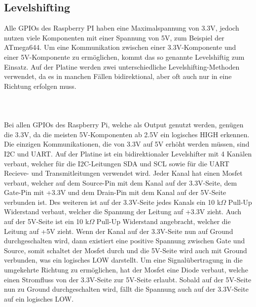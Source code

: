 \documentclass[12pt]{article}
\begin{document}
\subsection{Levelshifting}
Alle GPIOs des Raspberry PI haben eine Maximalspannung von 3.3V, jedoch nutzen viele Komponenten mit einer Spannung von 5V, zum Beispiel der ATmega644. Um eine Kommunikation zwischen einer 3.3V-Komponente und einer 5V-Komponente zu ermöglichen, kommt das so genannte Levelshiftig zum Einsatz. Auf der Platine werden zwei unterschiedliche Levelshifting-Methoden verwendet, da es in manchen Fällen bidirektional, aber oft auch nur in eine Richtung erfolgen muss. 
\\\\\\\\Bei allen GPIOs des Raspberry Pi, welche als Output genutzt werden, genügen die 3.3V, da die meisten 5V-Komponenten ab 2.5V ein logisches HIGH erkennen. Die einzigen Kommunikationen, die von 3.3V auf 5V erhöht werden müssen, sind I2C und UART. Auf der Platine ist ein bidirektionaler Levelshifter mit 4 Kanälen verbaut, welcher für die I2C-Leitungen SDA und SCL sowie für die UART Recieve- und Transmitleitungen verwendet wird. Jeder Kanal hat einen Mosfet verbaut, welcher auf dem Source-Pin mit dem Kanal auf der 3.3V-Seite, dem Gate-Pin mit +3.3V und dem Drain-Pin mit dem Kanal auf der 5V-Seite verbunden ist. Des weiteren ist auf der 3.3V-Seite jedes Kanals ein 10 k$\Omega$ Pull-Up Widerstand verbaut, welcher die Spannung der Leitung auf +3.3V zieht. Auch auf der 5V-Seite ist ein 10 k$\Omega$ Pull-Up Widerstand angebracht, welcher die Leitung auf +5V zieht. Wenn der Kanal auf der 3.3V-Seite nun auf Ground durchgeschalten wird, dann existiert eine positive Spannung zwischen Gate und Source, somit schaltet der Mosfet durch und die 5V-Seite wird auch mit Ground verbunden, was ein logisches LOW darstellt. Um eine Signalübertragung in die umgekehrte Richtung zu ermöglichen, hat der Mosfet eine Diode verbaut, welche einen Stromfluss von der 3.3V-Seite zur 5V-Seite erlaubt. Sobald auf der 5V-Seite nun zu Ground durchgeschalten wird, fällt die Spannung auch auf der 3.3V-Seite auf ein logisches LOW.
\end{document}
